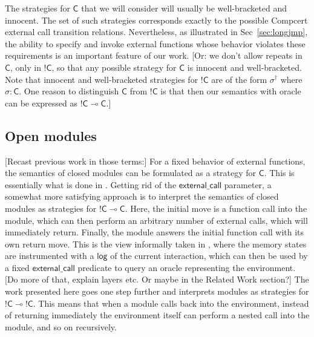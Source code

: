 \documentclass[acmsmall,anonymous]{acmart}
\newcommand{\kw}[1]{\ensuremath{ \textsf{#1} }}
\newcommand{\EC}{\kw{C}}
\begin{document}
The strategies for $\EC$ that we will consider
will usually be well-bracketed and innocent.
The set of such strategies corresponds exactly to
the possible Compcert external call transition relations.
Nevertheless,
as illustrated in Sec~\ref{sec:longjmp},
the ability to specify and invoke external functions
whose behavior violates these requirements
is an important feature of our work.
[Or: we don't allow repeats in $\EC$, only in $!\EC$,
so that any possible strategy for $\EC$ is innocent and well-bracketed.
Note that innocent and well-bracketed strategies for $!\EC$
are of the form $\sigma^\dagger$ where $\sigma : \EC$.
One reason to distinguish $\EC$ from $!\EC$
is that then our semantics with oracle can be expressed as
$!\EC \multimap \EC$.]


\subsection{Open modules} %

[Recast previous work in those terms:]
For a fixed behavior of external functions,
the semantics of closed modules can be
formulated as a strategy for $\EC$.
This is essentially what is done in \citep{popl15}.
Getting rid of the $\kw{external\_call}$ parameter,
a somewhat more satisfying approach is
to interpret the semantics of closed modules
as strategies for
$!\EC \multimap \EC$.
Here,
the initial move is a function call into the module,
which can then perform
an arbitrary number of external calls,
which will immediately return.
Finally,
the module answers the initial function call
with its own return move.
This is the view informally taken in \citep{osdi16},
where the memory states are instrumented with a \kw{log}
of the current interaction,
which can then be used by
a fixed $\kw{external\_call}$ predicate
to query an oracle representing the environment.
[Do more of that, explain layers etc.
Or maybe in the Related Work section?]
The work presented here goes one step further
and interprets modules as strategies for $!\EC \multimap !\EC$.
This means that
when a module calls back into the environment,
instead of returning immediately
the environment itself
can perform a nested call into the module,
and so on recursively.
\end{document}
